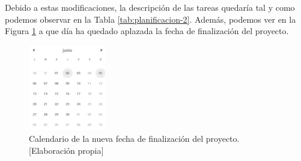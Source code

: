 Debido a estas modificaciones, la descripción de las tareas quedaría tal y como podemos observar en la Tabla \ref {tab:planificacion-2}. Además, podemos ver en la Figura \ref {fig:calendario-2} a que día ha quedado aplazada la fecha de finalización del proyecto.
\begin{figure}[ht]
    \centering
    \includegraphics[width=0.3\textwidth]{img/calendario-2.png}
    \caption{Calendario de la nueva fecha de finalización del proyecto. [Elaboración propia]}
    \label{fig:calendario-2}
\end{figure}
